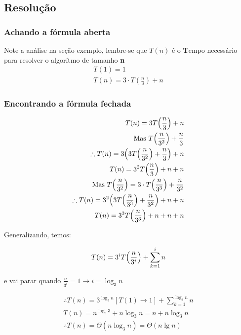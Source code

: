 \documentclass{article}
\begin{document}
\subsection{Resolução}

\subsubsection{Achando a fórmula aberta}
Note a análise na seção exemplo, lembre-se que $T(n)$ é o \textbf{T}empo necessário para resolver o algorítmo de tamanho \textbf{n}
\begin{align*}
    T(1) = 1 \\
    T(n) = 3\cdot T(\frac{n}{3}) + n
\end{align*}

\subsubsection{Encontrando a fórmula fechada}

\begin{align*}
    T(n) = 3T\Bigl(\frac{n}{3}\Bigr) + n \\
    \text{Mas }T\Bigl( \frac{n}{3^2}\Bigr)+\frac{n}{3} \\
    \therefore T(n) = 3\Bigl(3T\Bigl(\frac{n}{3^2}\Bigr)+\frac{n}{3}\Bigr) + n \\
    T(n) = 3^2 T\Bigl(\frac{n}{3}\Bigr)+n+n \\
    \text{Mas }T\Bigl( \frac{n}{3^2}\Bigr) = 3\cdot T \Bigl( \frac{n}{3^3}\Bigr) + \frac{n}{3^2} \\
    \therefore T(n) = 3^2\Bigl(3T\Bigl(\frac{n}{3^3}\Bigr) + \frac{n}{3^2}\Bigr) + n + n \\
    T(n) = 3^3T\Bigl(\frac{n}{3^3}\Bigr) + n + n + n
\end{align*}

Generalizando, temos: 

\begin{align*}
    T(n) = 3^i T\Bigl(\frac{n}{3^i}\Bigr) + \sum^i_{k= 1}n
\end{align*}

e vai parar quando $\frac{n}{3^i} = 1 \longrightarrow \boxed{i = \log_3 n}$

\begin{align*}
    \therefore T(n) = 3^{\log_3 n}[T(1) \rightarrow 1] + \sum^{\log_3 n}_{k = 1} n \\
    T(n) = n^{\log_3 3} + n \log_3 n = n + n \log_3 n \\
    \therefore T(n) = \Theta (n \log_3 n) = \boxed{\Theta (n \lg n)}
\end{align*}
\end{document}
